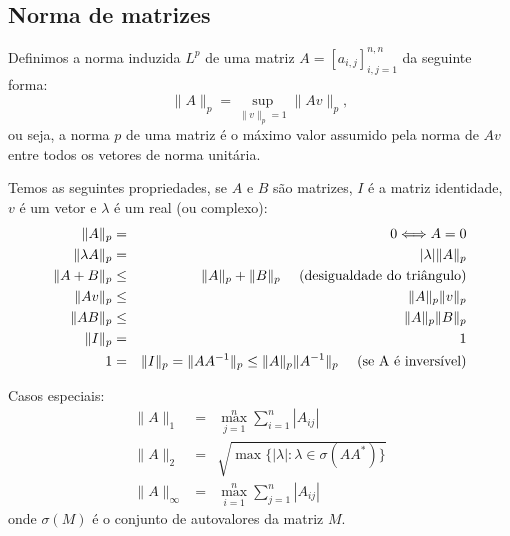 \subsection{Norma de matrizes}

Definimos a norma induzida $L^p$ de uma matriz $A = [a_{i,j}]_{i,j=1}^{n,n}$ da seguinte forma:
\begin{equation*}
  \|A\|_p = \sup_{\|v\|_p=1} \|Av\|_p,
\end{equation*}
ou seja, a norma $p$ de uma matriz é o máximo valor assumido pela norma de $Av$ entre todos os vetores de norma unitária.

Temos as seguintes propriedades, se $A$ e $B$ são matrizes, $I$ é a matriz identidade, $v$ é um vetor e $\lambda$ é um real (ou complexo):
\begin{eqnarray*}
\|A\|_p&=&0 \Longleftrightarrow A=0\\
\|\lambda A\|_p&=&|\lambda| \|A\|_p\\
\|A+B\|_p &\leq & \|A\|_p + \|B\|_p~~~~ (\hbox{desigualdade do triângulo})\\
\|Av\|_p &\leq& \|A\|_p\|v\|_p\\
\|AB\|_p &\leq& \|A\|_p\|B\|_p\\
\|I\|_p&=&1\\
1&=&\|I\|_p=\|AA^{-1}\|_p\leq \|A\|_p\|A^{-1}\|_p~~~~ \hbox{(se A é inversível)}
\end{eqnarray*}

Casos especiais:
\begin{eqnarray*}
\|A\|_1&=& \max_{j=1}^n\sum_{i=1}^n |A_{ij}|\\
\|A\|_2&=& \sqrt{\max\{|\lambda|: \lambda \in \sigma(AA^*)\}}\\
\|A\|_\infty&=& \max_{i=1}^n\sum_{j=1}^n |A_{ij}|
\end{eqnarray*}
onde $\sigma(M)$ é o conjunto de autovalores da matriz $M$.

